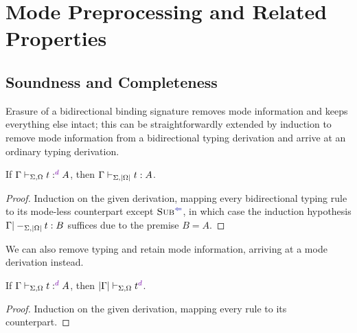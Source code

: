 
\section{Mode Preprocessing and Related Properties}\label{sec:pre-synthesis}


\subsection{Soundness and Completeness}
\label{sec:soundness-and-completeness}



Erasure of a bidirectional binding signature removes mode information and keeps everything else intact; this can be straightforwardly extended by induction to remove mode information from a bidirectional typing derivation and arrive at an ordinary typing derivation.

\begin{lemma}[Soundness]\label{thm:soundness}
If\/ $\Gamma \vdash_{\Sigma, \Omega} t :^\dir{d} A$, then $\Gamma \vdash_{\Sigma, \left|\Omega\right|} t : A$.
\end{lemma}

\begin{proof}
Induction on the given derivation, mapping every bidirectional typing rule to its mode-less counterpart except $\ChkRule{Sub}$, in which case the induction hypothesis $\Gamma |-_{\Sigma,\left|\Omega\right|} t : B$ suffices due to the premise $B = A$.
\end{proof}

We can also remove typing and retain mode information, arriving at a mode derivation instead.

\begin{proposition}\label{thm:typing-removal}
If\/ $\Gamma \vdash_{\Sigma, \Omega} t :^\dir{d} A$, then $\erase\Gamma \vdash_{\Sigma, \Omega} t^\dir{d}$.
\end{proposition}

\begin{proof}
Induction on the given derivation, mapping every rule to its counterpart.
\end{proof}

